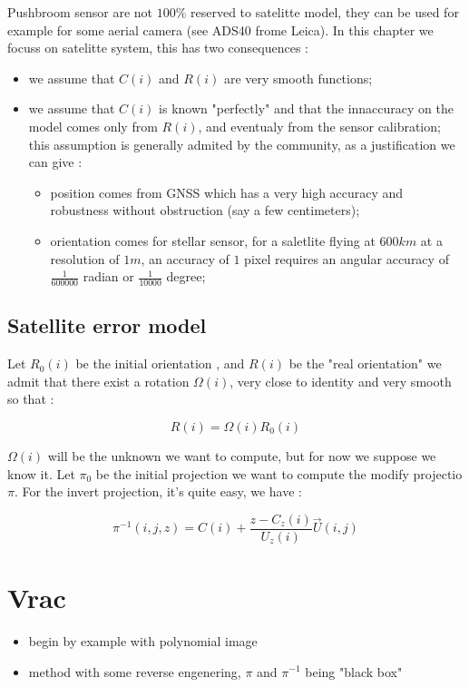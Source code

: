 Pushbroom sensor are not $100\%$ reserved to satelitte model, they can be used for example for some
aerial camera (see ADS40 frome Leica).
In this chapter we  focuss on satelitte system, this has two consequences :

\begin{itemize}
    \item we assume that $C(i)$  and $R(i)$  are very smooth functions;
    \item we assume that $C(i)$  is known  "perfectly" and that the innaccuracy
          on the model comes only from $R(i)$, and eventualy from the sensor calibration;  this assumption is generally admited
          by the community, as a justification we can give :
    \begin{itemize}
         \item  position comes from GNSS which has a very high accuracy and robustness without obstruction (say a few centimeters);
         \item  orientation comes for stellar sensor, for a saletlite flying at $600km$ at a resolution of $1m$,
                an accuracy of $1$ pixel requires an angular accuracy of $\frac{1}{600000}$ radian or $\frac{1}{10000}$ degree;
     \end{itemize}
\end{itemize}


\subsection{Satellite error model}

Let $R_0(i)$ be the initial orientation , and $R(i)$ be the "real orientation"
we admit that there exist a rotation $\Omega(i)$, very close to identity and
very smooth so that :

\begin{equation}
    R(i) = \Omega(i) R_0(i)
\end{equation}


$\Omega(i)$ will be the unknown we want to compute, but for now
we suppose we know it. 
Let $\pi_0$ be the initial projection we want to compute the modify
projectio $\pi$.
For the invert projection, it's quite easy, we have :

\begin{equation}
	\pi^{-1}(i,j,z) = C(i) + \frac{z-C_z(i)}{U_z(i)} \vec{U}(i,j)
\end{equation}





\section{Vrac}

\begin{itemize}
    \item begin by example with polynomial image
    \item method with some reverse engenering,  $\pi$ and $\pi^{-1}$ being "black box"
\end{itemize}


